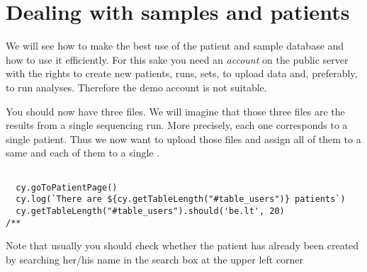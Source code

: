 \section{Dealing with samples and patients}
We will see how to make the best use of the patient and sample database and
how to use it efficiently.
For this sake you need an \textit{account} on the public server with the rights to create new patients,
runs, sets, to upload data and, preferably, to run analyses.
Therefore the demo account is not suitable.




You should now have three files. We will imagine that those three files are
the results from a single sequencing run. More precisely, each one corresponds to
a single patient. Thus we now want to upload those files and assign all of
them to a same  and each of them to a single .

\begin{verbatim}

  cy.goToPatientPage()
  cy.log(`There are ${cy.getTableLength("#table_users")} patients`)
  cy.getTableLength("#table_users").should('be.lt', 20)
/**

\end{verbatim}

Note that usually you should check whether the patient has
already been created by searching her/his name in the search box at the
upper left corner

